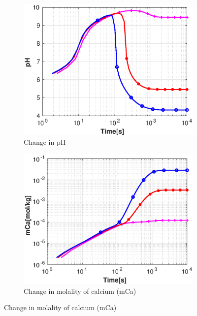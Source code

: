 \begin{figure}[!h]
        \centering
    \begin{subfigure}{.5\linewidth}
            \centering
        \includegraphics[width=\textwidth]{PICTURES/with_CO2_pH.eps}
        \caption{\small Change in pH}
        \label{fig:CO2pH}
    \end{subfigure}%
        \hfill
    \begin{subfigure}{.5\linewidth}
            \centering
        \includegraphics[width=\textwidth]{PICTURES/with_CO2_mCa.eps}
        \caption{\small Change in molality of calcium (mCa)}
        \label{fig:CO2mCa}
    \end{subfigure}%

\end{figure}

